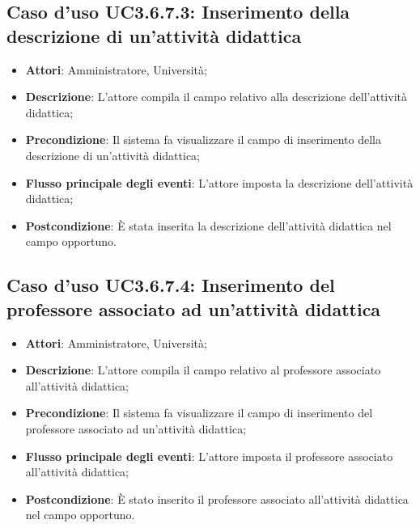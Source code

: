 \subsection{Caso d'uso \texorpdfstring{UC3.6.7.3}{UC3.6.7.3}: Inserimento della descrizione di un'attività didattica}
\begin{itemize}
	\item \textbf{Attori}: Amministratore, Università;
	\item \textbf{Descrizione}: L'attore compila il campo relativo alla descrizione dell'attività didattica;
	
	\item \textbf{Precondizione}: Il sistema fa visualizzare il campo di inserimento della descrizione di un'attività didattica;
	
	\item \textbf{Flusso principale degli eventi}: L'attore imposta la descrizione dell'attività didattica;
	
	\item \textbf{Postcondizione}: È stata inserita la descrizione dell'attività didattica nel campo opportuno.
	
\end{itemize}
\subsection{Caso d'uso \texorpdfstring{UC3.6.7.4}{UC3.6.7.4}: Inserimento del professore associato ad un'attività didattica}
\begin{itemize}
	\item \textbf{Attori}: Amministratore, Università;
	\item \textbf{Descrizione}: L'attore compila il campo relativo al professore associato all'attività didattica;
	
	\item \textbf{Precondizione}: Il sistema fa visualizzare il campo di inserimento del professore associato ad un'attività didattica;
	\item \textbf{Flusso principale degli eventi}: L'attore imposta il professore associato all'attività didattica;
	
	\item \textbf{Postcondizione}: È stato inserito il professore associato all'attività didattica nel campo opportuno.
	
\end{itemize}
